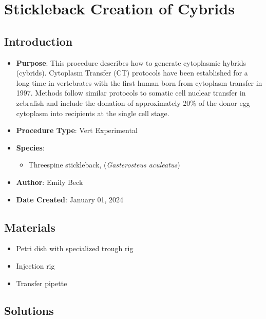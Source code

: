 \documentclass[
  letterpaper,
  DIV=11,
  numbers=noendperiod]{scrreprt}
\providecommand{\tightlist}{%
  \setlength{\itemsep}{0pt}\setlength{\parskip}{0pt}}\usepackage{longtable,booktabs,array}
\begin{document}
\hypertarget{sec-vert_exp-stickleback_cybrid}{%
\chapter{Stickleback Creation of
Cybrids}\label{sec-vert_exp-stickleback_cybrid}}

\hypertarget{introduction-74}{%
\section{Introduction}\label{introduction-74}}

\begin{itemize}
\tightlist
\item
  \textbf{Purpose}: This procedure describes how to generate cytoplasmic
  hybrids (cybrids). Cytoplasm Transfer (CT) protocols have been
  established for a long time in vertebrates with the first human born
  from cytoplasm transfer in 1997. Methods follow similar protocols to
  somatic cell nuclear transfer in zebrafish and include the donation of
  approximately 20\% of the donor egg cytoplasm into recipients at the
  single cell stage.
\item
  \textbf{Procedure Type}: Vert Experimental
\item
  \textbf{Species}:

  \begin{itemize}
  \tightlist
  \item
    Threespine stickleback, (\emph{Gasterosteus aculeatus})
  \end{itemize}
\item
  \textbf{Author}: Emily Beck
\item
  \textbf{Date Created}: January 01, 2024
\end{itemize}

\hypertarget{materials-70}{%
\section{Materials}\label{materials-70}}

\begin{itemize}
\tightlist
\item
  Petri dish with specialized trough rig
\item
  Injection rig
\item
  Transfer pipette
\end{itemize}

\hypertarget{solutions-62}{%
\section{Solutions}\label{solutions-62}}
\end{document}
